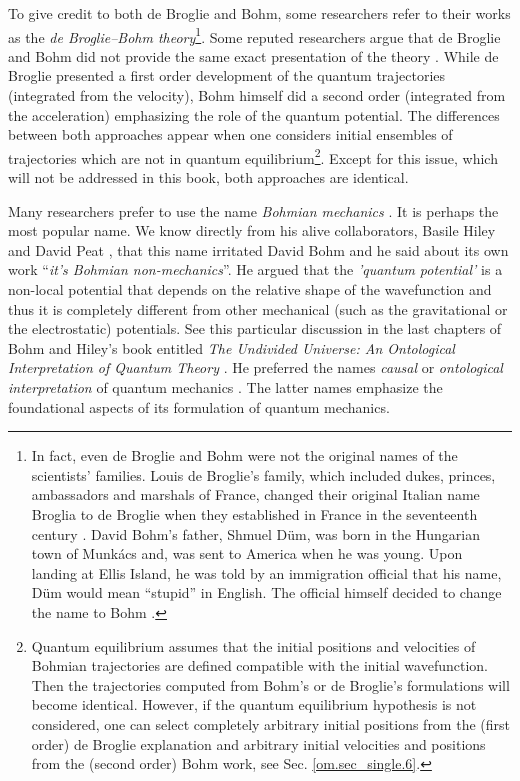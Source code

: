 \documentclass[onecolumn,nofootinbib, secnumarabic, amsmath, nobibnotes,11pt,aps,pra]{revtex4-1}
\newcommand{\sref}[1]{Sec. \ref{#1}}
\begin{document}
To give credit to both de Broglie and Bohm, some researchers refer to their works as the \emph{de Broglie--Bohm theory}\footnote{In fact, even de Broglie and Bohm were not the original names of the scientists' families.  Louis de Broglie's family, which included dukes, princes, ambassadors and marshals of France, changed their original Italian name Broglia to de Broglie when they established in France in the seventeenth century \cite{om.valentini2009Solvay}. David Bohm's father,  Shmuel D\"um,  was born in the Hungarian town of Munk\'acs and, was sent to America when he was young. Upon landing at Ellis Island, he was told by an immigration official that his name, D\"um would mean ``stupid'' in English. The official himself decided to change the name to Bohm \cite{om.infinite_potential}.}\cite{om.Holand1993}.
Some reputed researchers argue that de Broglie and Bohm did not provide the same exact presentation of the theory \cite{om.Valentini2006,om.valentini2008}. While de Broglie presented a first order development of the quantum trajectories (integrated from the velocity), Bohm himself did a second order (integrated from the acceleration) emphasizing the role of the quantum potential. The differences between both approaches appear when one considers initial ensembles of trajectories which are not in quantum equilibrium\footnote{Quantum equilibrium assumes that the initial positions and velocities of Bohmian trajectories are defined compatible with the initial wavefunction. Then the trajectories computed from Bohm's or de Broglie's formulations will become identical. However, if the quantum equilibrium hypothesis is not considered, one can select completely arbitrary initial positions from the (first order) de Broglie explanation and arbitrary initial velocities and positions from the (second order) Bohm work, see \sref{om.sec_single.6}.}. Except for this issue, which will not be addressed in this book, both approaches are identical.

Many researchers prefer to use the name \emph{Bohmian mechanics} \cite{om.Bohmian1996}. It is perhaps the most popular name. We know directly from his alive collaborators, Basile Hiley and David Peat \cite{om.davidpeat}, that this name irritated David Bohm and he said about its own work ``\textit{it's Bohmian non-mechanics}''. He argued that the {\emph{'quantum potential'}} is a non-local potential that depends on the relative shape of the wavefunction and thus it is completely different from other mechanical (such as the gravitational or the electrostatic) potentials. See this particular discussion in the last chapters of Bohm and Hiley's book entitled \emph{The Undivided Universe: An Ontological Interpretation of Quantum Theory} \cite{om.Bohm1993}. He preferred the names \emph{causal} or \emph{ontological interpretation} of quantum mechanics \cite{om.Holand1993,om.Bohm1993}. The latter names emphasize the foundational aspects of its formulation of quantum mechanics.
\end{document}
